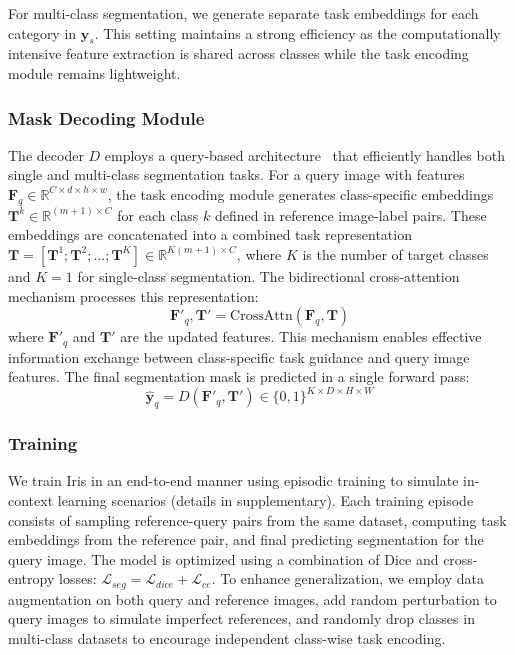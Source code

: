 For multi-class segmentation, we generate separate task embeddings for each category in $\boldsymbol{y}_s$. This setting maintains a strong efficiency as the computationally intensive feature extraction is shared across classes while the task encoding module remains lightweight.



\subsubsection*{Mask Decoding Module}
The decoder $D$ employs a query-based architecture~\cite{cheng2022masked} that efficiently handles both single and multi-class segmentation tasks. For a query image with features $\boldsymbol{F}_q \in \mathbb{R}^{C \times d \times h \times w}$, the task encoding module generates class-specific embeddings $\boldsymbol{T}^k \in \mathbb{R}^{(m+1) \times C}$ for each class $k$ defined in reference image-label pairs. These embeddings are concatenated into a combined task representation $\boldsymbol{T} = [\boldsymbol{T}^1; \boldsymbol{T}^2; ...; \boldsymbol{T}^K] \in \mathbb{R}^{K(m+1) \times C}$, where $K$ is the number of target classes and $K=1$ for single-class segmentation. The bidirectional cross-attention mechanism processes this representation:
\begin{equation}
\boldsymbol{F}'_q, \boldsymbol{T}' = \text{CrossAttn}(\boldsymbol{F}_q, \boldsymbol{T})
\end{equation}
where $\boldsymbol{F}'_q$ and $\boldsymbol{T}'$ are the updated features. This mechanism enables effective information exchange between class-specific task guidance and query image features. The final segmentation mask is predicted in a single forward pass:
\begin{equation}
\boldsymbol{\hat{y}}_q = D(\boldsymbol{F}'_q, \boldsymbol{T}') \in \{0,1\}^{K \times D \times H \times W}
\end{equation}

\subsubsection*{Training} We train Iris in an end-to-end manner using episodic training to simulate in-context learning scenarios (details in supplementary). Each training episode consists of sampling reference-query pairs from the same dataset, computing task embeddings from the reference pair, and final predicting segmentation for the query image. The model is optimized using a combination of Dice and cross-entropy losses: $\mathcal{L}_{seg} = \mathcal{L}_{dice} + \mathcal{L}_{ce}$. To enhance generalization, we employ data augmentation on both query and reference images, add random perturbation to query images to simulate imperfect references, and randomly drop classes in multi-class datasets to encourage independent class-wise task encoding.

